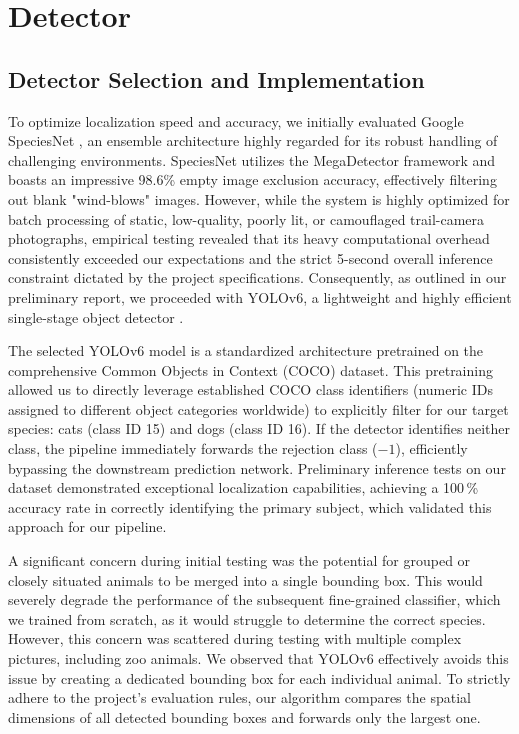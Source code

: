 \section{Detector}
\label{sec:detector}



 \subsection{Detector Selection and Implementation}

To optimize localization speed and accuracy, we initially evaluated Google SpeciesNet \cite{speciesnet2025}, an ensemble architecture highly regarded for its robust handling of challenging environments. 
SpeciesNet utilizes the MegaDetector framework \cite{megadetector2026} and boasts an impressive 98.6\% empty image exclusion accuracy, effectively filtering out blank "wind-blows" images. 
However, while the system is highly optimized for batch processing of static, low-quality, poorly lit, or camouflaged trail-camera photographs, empirical testing revealed that its heavy computational 
overhead consistently exceeded our expectations and the strict 5-second overall inference constraint dictated by the project specifications. Consequently, as outlined in our preliminary report, 
we proceeded with YOLOv6, a lightweight and highly efficient single-stage object detector \cite{li2022yolov6}.

The selected YOLOv6 model is a standardized architecture pretrained on the comprehensive Common Objects in Context (COCO) dataset. 
This pretraining allowed us to directly leverage established COCO class identifiers (numeric IDs assigned to different object categories worldwide) to explicitly filter for our target species: 
cats (class ID 15) and dogs (class ID 16). If the detector identifies neither class, the pipeline immediately forwards the rejection class ($-1$), efficiently bypassing the downstream prediction network. 
Preliminary inference tests on our dataset demonstrated exceptional localization capabilities, achieving a 100\,\% accuracy rate in correctly identifying the primary subject, which validated this approach 
for our pipeline.

A significant concern during initial testing was the potential for grouped or closely situated animals to be merged into a single bounding box. This would severely degrade the performance of the subsequent 
fine-grained classifier, which we trained from scratch, as it would struggle to determine the correct species. However, this concern was scattered during testing with multiple complex pictures, including
 zoo animals. We observed that YOLOv6 effectively avoids this issue by creating a dedicated bounding box for each individual animal. To strictly adhere to the project's evaluation rules, our algorithm compares
  the spatial dimensions of all detected bounding boxes and forwards only the largest one.


